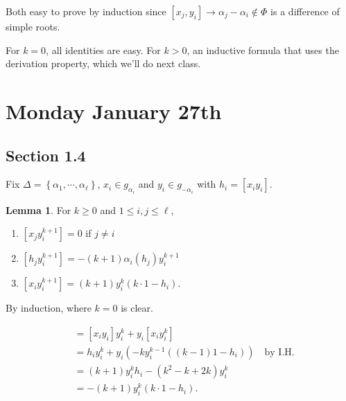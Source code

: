 \documentclass[11pt]{scrartcl}
\theoremstyle{definition}
\theoremstyle{theorem}
\newtheorem{lemma}[theorem]{Lemma}
\theoremstyle{proof}
\newenvironment{proof}
{\pushQED{$\qed$}\pf}
{\par\popQED\endpf}
\theoremstyle{definition}
\theoremstyle{break}
\theoremstyle{problem}
\providecommand{\tightlist}{%
  \setlength{\itemsep}{0pt}\setlength{\parskip}{0pt}}
\newcommand{\theset}[1]{\left\{{#1}\right\}}
\renewcommand{\qed}[0]{\hfill\blacksquare}
\renewcommand{\to}[0]{\longrightarrow}
\begin{document}
\begin{proof}[sketch]

Both easy to prove by induction since
\([x_j, y_i] \to \alpha_j - \alpha_i \not\in \Phi\) is a difference of
simple roots.

For \(k=0\), all identities are easy. For \(k> 0\), an inductive formula
that uses the derivation property, which we'll do next class.\end{proof}

\hypertarget{monday-january-27th}{%
\section{Monday January 27th}\label{monday-january-27th}}

\hypertarget{section-1.4}{%
\subsection{Section 1.4}\label{section-1.4}}

Fix \(\Delta = \theset{\alpha_1, \cdots, \alpha_\ell}\),
\(x_i \in g_{\alpha_i}\) and \(y_i \in g_{-\alpha_i}\) with
\(h_i = [x_i y_i]\).

\begin{lemma}

For \(k\geq 0\) and \(1 \leq i, j \leq \ell\),

\begin{enumerate}
\def\labelenumi{\alph{enumi}.}
\tightlist
\item
  \([x_j y_i^{k+1}] = 0\) if \(j\neq i\)
\item
  \([h_j y_i^{k+1}] = -(k+1) \alpha_i(h_j) y_i^{k+1}\)
\item
  \([x_i y_i^{k+1}] = (k+1) y_i^{k} (k\cdot 1 - h_i)\).
\end{enumerate}

\end{lemma}

\begin{proof}[Sketch for (c)]

By induction, where \(k=0\) is clear.

\begin{align*}
[x+i y_i^{k+1}]
&= [x_i y_i] y_i^k + y_i [x_i y_i^k] \\
&=h_i y_i^k + y_i(-k y_i^{k-1} ((k-1)1 - h_i)) \quad\text{by I.H.} \\
&= (k+1)y_i^k h_i - (k^2 -k + 2k)y_i^k \\
&= -(k+1) y_i^k ( k\cdot 1 - h_i )
.\end{align*}\end{proof}
\end{document}
